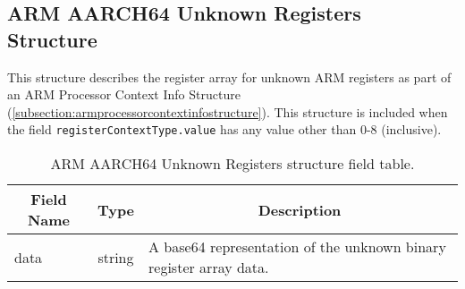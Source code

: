 \documentclass{report}
\newcommand*{\thead}[1]{\multicolumn{1}{|c|}{\bfseries #1}}
\newcommand*{\jsontable}[1]{
    \begin{table}[!ht]
    \label{#1}
    \centering
    \begin{adjustbox}{center}
    \begin{tabular}{|l|c|p{8cm}|}
    \hline
    \thead{Field Name} & \thead{Type} & \thead{Description} \\
    \hline
}
\newcommand*{\jsontableend}[1]{
    \hline
    \end{tabular}
    \end{adjustbox}
    \caption{#1}
    \label{table:#1}
    \end{table}
    \FloatBarrier
}
\begin{document}
\subsection{ARM AARCH64 Unknown Registers Structure}
\label{subsection:armunknownregistersstructure}
This structure describes the register array for unknown ARM registers as part of an ARM Processor Context Info Structure (\ref{subsection:armprocessorcontextinfostructure}). This structure is included when the field \texttt{registerContextType.value} has any value other than 0-8 (inclusive).
\jsontable{table:armunknownregistersstructure}
data & string & A base64 representation of the unknown binary register array data.\\
\jsontableend{ARM AARCH64 Unknown Registers structure field table.}

\end{document}
